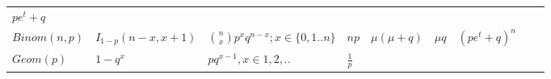 \documentclass[]{tufte-book}
\begin{document}
\begin{longtable}[]{@{}lllllllll@{}}
\begin{minipage}[t]{0.08\columnwidth}
\(pe^t+q\)\strut
\end{minipage} & \begin{minipage}[t]{0.08\columnwidth}\raggedright
\strut
\end{minipage} & \begin{minipage}[t]{0.08\columnwidth}\raggedright
\strut
\end{minipage}\tabularnewline
\begin{minipage}[t]{0.08\columnwidth}\raggedright
\(Binom(n,p)\)\strut
\end{minipage} & \begin{minipage}[t]{0.08\columnwidth}\raggedright
\(I_{1-p}(n-x,x+1)\)\strut
\end{minipage} & \begin{minipage}[t]{0.08\columnwidth}\raggedright
\(\binom{n}{x}p^x q^{n-x}; x \in \{0,1..n\}\)\strut
\end{minipage} & \begin{minipage}[t]{0.08\columnwidth}\raggedright
\(np\)\strut
\end{minipage} & \begin{minipage}[t]{0.08\columnwidth}\raggedright
\(\mu(\mu+q)\)\strut
\end{minipage} & \begin{minipage}[t]{0.08\columnwidth}\raggedright
\(\mu{q}\)\strut
\end{minipage} & \begin{minipage}[t]{0.08\columnwidth}\raggedright
\((pe^t+q)^n\)\strut
\end{minipage} & \begin{minipage}[t]{0.08\columnwidth}\raggedright
\strut
\end{minipage} & \begin{minipage}[t]{0.08\columnwidth}\raggedright
\strut
\end{minipage}\tabularnewline
\begin{minipage}[t]{0.08\columnwidth}\raggedright
\(Geom(p)\)\strut
\end{minipage} & \begin{minipage}[t]{0.08\columnwidth}\raggedright
\(1-q^x\)\strut
\end{minipage} & \begin{minipage}[t]{0.08\columnwidth}\raggedright
\(pq^{x-1},x\in 1,2,..\)\strut
\end{minipage} & \begin{minipage}[t]{0.08\columnwidth}\raggedright
\(\frac1p\)\strut
\end{minipage} & \begin{minipage}[t]{0.08\columnwidth}\raggedright

\end{minipage}
\end{longtable}
\end{document}
